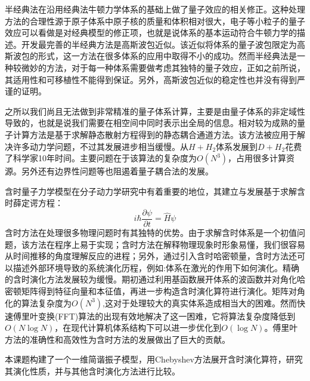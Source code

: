 半经典法在沿用经典法牛顿力学体系的基础上做了量子效应的相关修正。这种处理方法的合理性源于原子体系中原子核的质量和体积相对很大，电子等小粒子的量子效应可以看做是对经典模型的修正项，也就是说体系的基本运动符合牛顿力学的描述。开发最完善的半经典方法是高斯波包近似。该近似将体系的量子波包限定为高斯波包的形式，这一方法在很多体系的应用中取得不小的成功。然而半经典法是一种较微妙的方法，对于每一种体系需要做考虑其独特的量子效应，正如之前所说，其适用性和可移植性不能得到保证。另外，高斯波包近似的稳定性也并没有得到严谨的证明。

之所以我们尚且无法做到非常精准的量子体系计算，主要是由量子体系的非定域性导致的，也就是说我们需要在相空间中同时表示出全局的信息。相对较为成熟的量子计算方法是基于求解静态散射方程得到的静态耦合通道方法。该方法被应用于解决许多动力学问题，不过其发展进步相当缓慢。从$H + H_2$体系发展到$D + H_2$花费了科学家10年时间。主要问题在于该算法的复杂度为$O(N^3)$，占用很多计算资源。另外还有边界性问题等也阻遏着量子耦合法的发展。

含时量子力学模型在分子动力学研究中有着重要的地位，其建立与发展基于求解含时薛定谔方程：
\begin{equation}
  i \hbar \frac{\partial \psi}{\partial t} = \hat{H} \psi  
\end{equation} 
含时方法在处理很多物理问题时有其独特的优势。由于求解含时体系是一个初值问题，该方法在程序上易于实现；含时方法在解释物理现象时形象易懂，我们很容易从时间推移的角度理解反应的进程；另外，通过引入含时哈密顿量，含时方法还可以描述外部环境导致的系统演化历程，例如:体系在激光的作用下如何演化。精确的含时演化方法发展较为缓慢。期初通过利用基函数展开体系的波函数并对角化哈密顿矩阵得到特征向量和本征值，再进一步构造含时演化算符进行演化。矩阵对角化的算法复杂度为$O(N^3)$,这对于处理较大的真实体系造成相当大的困难。然而快速傅里叶变换(FFT)算法的出现有效地解决了这一困难，它将算法复杂度降低到$O(N\log N)$，在现代计算机体系结构下可以进一步优化到$O(\log N)$。傅里叶方法的准确性和高效性为含时方法的发展做出了巨大的贡献。

本课题构建了一个一维简谐振子模型，用Chebyshev方法展开含时演化算符，研究其演化性质，并与其他含时演化方法进行比较。